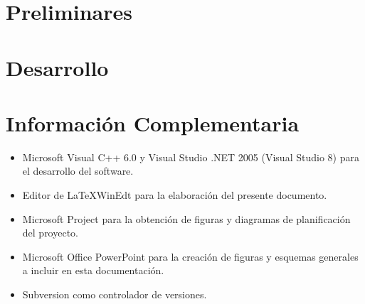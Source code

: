 \documentclass[a4paper,12pt]{book}
\begin{document}
\thispagestyle{empty}\pagestyle{empty}

\frontmatter


\tableofcontents
\listoffigures
\listoftables

\mainmatter

\part{Preliminares}



\part{Desarrollo}




\part{Información Complementaria}



\appendix







\nocite{*}


\begin{itemize}
  \item Microsoft Visual C++ 6.0 y  Visual Studio .NET 2005 (Visual Studio 8) para el desarrollo del software.
  \item Editor de \LaTeX WinEdt para la elaboraci\'{o}n del presente documento.
  \item Microsoft Project para la obtenci\'{o}n de figuras y diagramas de planificaci\'{o}n del proyecto.
  \item Microsoft Office PowerPoint para la creaci\'{o}n de figuras y esquemas generales a incluir en esta documentaci\'{o}n.
  \item Subversion como controlador de versiones.
\end{itemize}
\end{document}

